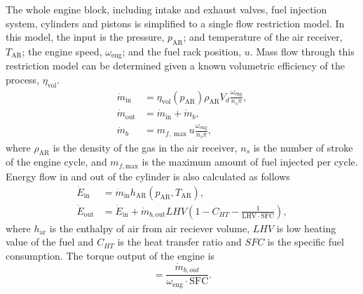 \documentclass[journal]{IEEEtran}
\begin{document}
The whole engine block, including intake and exhaust valves, fuel injection system, cylinders and pistons is simplified to a single flow restriction model. 
In this model, the input is the pressure, $p_{\mathrm{AR}}$; and temperature of the air receiver, $T_{\mathrm{AR}}$; the engine speed, $\omega_\mathrm{eng}$; and the fuel rack position, $u$. Mass flow through this restriction model can be determined given a known volumetric efficiency of the process, $\eta_\mathrm{vol}$. 
\begin{equation}
\begin{aligned}
{{\dot m}_\mathrm{in}} &= {\eta _\mathrm{vol}}\left( {{p_\mathrm{AR}}} \right)  {\rho _\mathrm{AR}}{V_d}\frac{{{\omega _{{\mathrm{eng}}}}}}{{n_s \pi }}, \\
{{\dot m}_\mathrm{out}} &= {{\dot m}_\mathrm{in}} + {{\dot m}_{b}}, \\
{{\dot m}_{b}} &= {m_{f,\max }} u \frac{{{\omega _{{\mathrm{eng}}}}}}{{n_s \pi }} ,
\end{aligned}
\end{equation}
where $\rho_\mathrm{AR}$ is the density of the gas in the air receiver, $n_s$ is the number of stroke of the engine cycle, and ${m_{f,\mathrm{max} }}$ is the maximum amount of fuel injected per cycle.
Energy flow in and out of the cylinder is also calculated as follows
\begin{equation}
\begin{aligned}
{{\dot E}_\mathrm{in}} &= {{\dot m}_\mathrm{in}}{h_\mathrm{AR}}\left( {{p_\mathrm{AR}},{T_\mathrm{AR}}} \right), \\
{{\dot E}_\mathrm{out}} &=  \dot E_\mathrm{in}+ {{\dot m}_{b,\mathrm{out}}}LHV\left( {1 - {C_{HT}} - \frac{1}{{\mathrm{LHV} \cdot \mathrm{SFC}}}} \right),
\end{aligned}
\end{equation}
where $h_\mathrm{ar}$ is the enthalpy of air from air reciever volume, $LHV$ is low heating value of the fuel and $C_{HT}$ is the heat transfer ratio and $SFC$ is the specific fuel consumption. 
The torque output of the engine is
\begin{equation}
 = \frac{\dot{m}_{b,out}}{ \omega _\mathrm{eng} \cdot \mathrm{SFC} }.
\end{equation}
\end{document}
